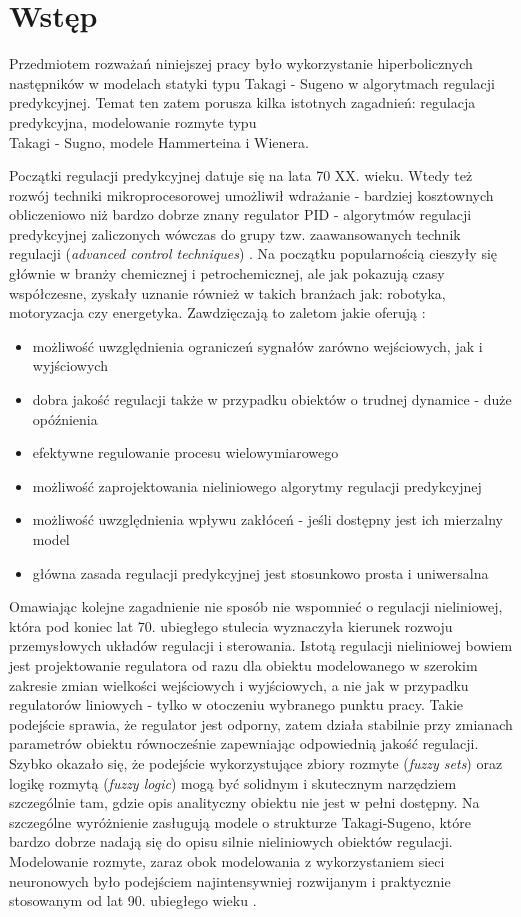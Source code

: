 \chapter{Wstęp}
Przedmiotem rozważań niniejszej pracy było wykorzystanie hiperbolicznych następników w modelach statyki typu Takagi - Sugeno w algorytmach regulacji predykcyjnej. Temat ten zatem porusza kilka istotnych zagadnień: regulacja predykcyjna, modelowanie rozmyte typu \\ Takagi - Sugno, modele Hammerteina i Wienera.

Początki regulacji predykcyjnej datuje się na lata 70 XX. wieku. Wtedy też rozwój techniki mikroprocesorowej umożliwił wdrażanie - bardziej kosztownych obliczeniowo niż bardzo dobrze znany regulator PID - algorytmów regulacji predykcyjnej zaliczonych wówczas do grupy tzw. zaawansowanych technik regulacji (\textit{advanced control techniques}) \cite{35}. Na początku popularnością cieszyły się głównie w branży chemicznej i petrochemicznej, ale jak pokazują czasy współczesne, zyskały uznanie również w takich branżach jak: robotyka, motoryzacja czy energetyka. Zawdzięczają to zaletom jakie oferują \cite{160, 170, 120}:
\begin{itemize}
\item możliwość uwzględnienia ograniczeń sygnałów zarówno wejściowych, jak i wyjściowych
\item dobra jakość regulacji także w przypadku obiektów o trudnej dynamice - duże opóźnienia
\item efektywne regulowanie procesu wielowymiarowego
\item możliwość zaprojektowania nieliniowego algorytmy regulacji predykcyjnej 
\item możliwość uwzględnienia wpływu zakłóceń - jeśli dostępny jest ich mierzalny model 
\item główna zasada regulacji predykcyjnej jest stosunkowo prosta i uniwersalna
\end{itemize}

Omawiając kolejne zagadnienie nie sposób nie wspomnieć o regulacji nieliniowej, która pod koniec lat 70. ubiegłego stulecia wyznaczyła kierunek rozwoju przemysłowych układów regulacji i sterowania. Istotą regulacji nieliniowej bowiem jest projektowanie regulatora od razu dla obiektu modelowanego w szerokim zakresie zmian wielkości wejściowych i wyjściowych, a nie jak w przypadku regulatorów liniowych - tylko w otoczeniu wybranego punktu pracy. Takie podejście sprawia, że regulator jest odporny, zatem działa stabilnie przy zmianach parametrów obiektu równocześnie zapewniając odpowiednią jakość regulacji. Szybko okazało się, że podejście wykorzystujące zbiory rozmyte (\textit{fuzzy sets}) oraz logikę rozmytą (\textit{fuzzy logic}) mogą być solidnym i skutecznym narzędziem szczególnie tam, gdzie opis analityczny obiektu nie jest w pełni dostępny. Na szczególne wyróżnienie zasługują modele o strukturze Takagi-Sugeno, które bardzo dobrze nadają się do opisu silnie nieliniowych obiektów regulacji. Modelowanie rozmyte, zaraz obok modelowania z wykorzystaniem sieci neuronowych było podejściem najintensywniej rozwijanym i praktycznie stosowanym od lat 90. ubiegłego wieku \cite{160, 120}. 


